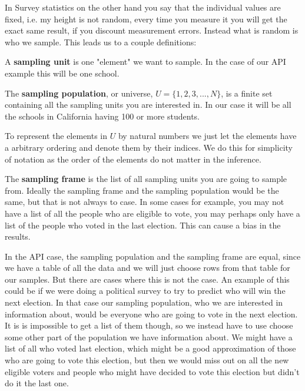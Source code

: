 \documentclass{article}
\begin{document}
In Survey statistics on the other hand you say that the individual values are
fixed, i.e. my height is not random, every time you measure it you will get the
exact same result, if you discount measurement errors. Instead what is random is
who we sample. This leads us to a couple definitions:

\begin{definition} \label{def:sampUnit}
  A \textbf{sampling unit} is one "element" we want to sample. In the case of
  our API example this will be one school.
\end{definition}

\begin{definition} \label{def:sampPop}
The \textbf{sampling population}, or universe, $U = \{1, 2, 3, ..., N\}$, is a
finite set containing all the sampling units you are interested in. In our case
it will be all the schools in California having 100 or more students.
\end{definition}

To represent the elements in $U$ by natural numbers we just let the elements
have a arbitrary ordering and denote them by their indices. We do this for
simplicity of notation as the order of the elements do not matter in the inference.

\begin{definition} \label{def:sampFrame}
The \textbf{sampling frame} is the list of all sampling units you are going to sample from. Ideally the sampling frame and the sampling population would be the same, but that is not always to case. In some cases for example, you may not have a list of all the people who are eligible to vote, you may perhaps only have a list of the people who voted in the last election. This can cause a bias in the results.
\end{definition}

In the API case, the sampling population and the sampling frame are equal, since
we have a table of all the data and we will just choose rows from that table for
our samples. But there are cases where this is not the case. An example of this
could be if we were doing a political survey to try to predict who will win the
next election.
In that case our sampling population, who we are interested in information
about, would be everyone who are going to vote in the next election. It is
is impossible to get a list of them though, so we instead have to use choose
some other part of the population we have information about. We might have a
list of all who voted last election, which might be a good approximation of
those who are going to vote this election, but then we would miss out on all the
new eligible voters and people who might have decided to vote this election but
didn't do it the last one.
\end{document}
